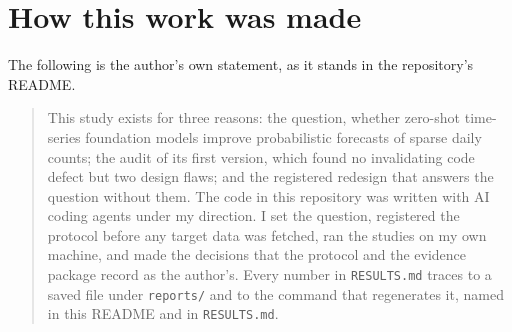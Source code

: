 \section{How this work was made}

The following is the author's own statement, as it stands in the repository's README.

\begin{quote}
This study exists for three reasons: the question, whether zero-shot time-series foundation models improve
probabilistic forecasts of sparse daily counts; the audit of its first version, which found no invalidating
code defect but two design flaws; and the registered redesign that answers the question without them. The
code in this repository was written with AI coding agents under my direction. I set the question, registered
the protocol before any target data was fetched, ran the studies on my own machine, and made the decisions
that the protocol and the evidence package record as the author's. Every number in \texttt{RESULTS.md} traces
to a saved file under \texttt{reports/} and to the command that regenerates it, named in this README and in
\texttt{RESULTS.md}.
\end{quote}
